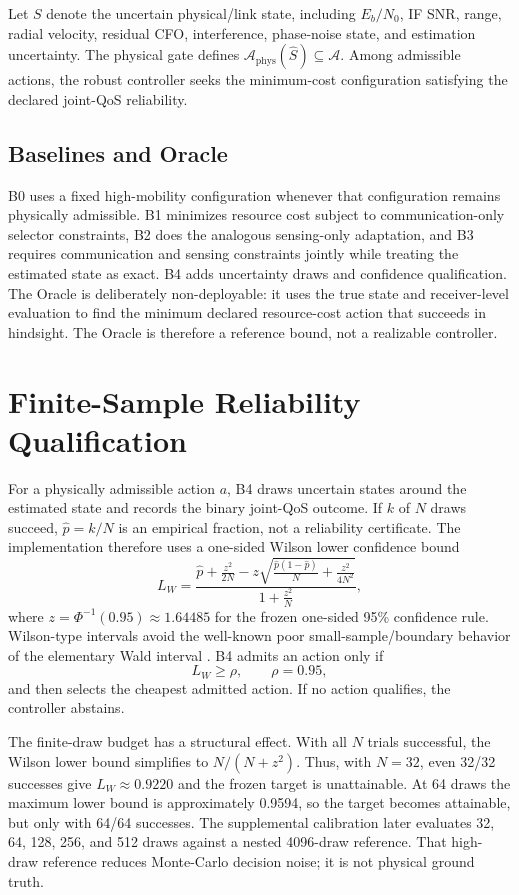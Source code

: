 \documentclass[journal]{IEEEtran}
\begin{document}
Let $S$ denote the uncertain physical/link state, including $E_b/N_0$, IF SNR, range, radial velocity, residual CFO, interference, phase-noise state, and estimation uncertainty. The physical gate defines $\mathcal{A}_{\mathrm{phys}}(\hat S)\subseteq\mathcal{A}$. Among admissible actions, the robust controller seeks the minimum-cost configuration satisfying the declared joint-QoS reliability.

\subsection{Baselines and Oracle}
B0 uses a fixed high-mobility configuration whenever that configuration remains physically admissible. B1 minimizes resource cost subject to communication-only selector constraints, B2 does the analogous sensing-only adaptation, and B3 requires communication and sensing constraints jointly while treating the estimated state as exact. B4 adds uncertainty draws and confidence qualification. The Oracle is deliberately non-deployable: it uses the true state and receiver-level evaluation to find the minimum declared resource-cost action that succeeds in hindsight. The Oracle is therefore a reference bound, not a realizable controller.

\section{Finite-Sample Reliability Qualification}
\label{sec:confidence}
For a physically admissible action $a$, B4 draws uncertain states around the estimated state and records the binary joint-QoS outcome. If $k$ of $N$ draws succeed, $\hat p=k/N$ is an empirical fraction, not a reliability certificate. The implementation therefore uses a one-sided Wilson lower confidence bound
\begin{equation}
 L_W=\frac{\hat p+\frac{z^2}{2N}-z\sqrt{\frac{\hat p(1-\hat p)}{N}+\frac{z^2}{4N^2}}}{1+\frac{z^2}{N}},
\end{equation}
where $z=\Phi^{-1}(0.95)\approx1.64485$ for the frozen one-sided 95\% confidence rule. Wilson-type intervals avoid the well-known poor small-sample/boundary behavior of the elementary Wald interval \cite{brown2001binomial}. B4 admits an action only if
\begin{equation}
 L_W\ge\rho,\qquad \rho=0.95,
\end{equation}
and then selects the cheapest admitted action. If no action qualifies, the controller abstains.

The finite-draw budget has a structural effect. With all $N$ trials successful, the Wilson lower bound simplifies to $N/(N+z^2)$. Thus, with $N=32$, even 32/32 successes give $L_W\approx0.9220$ and the frozen target is unattainable. At 64 draws the maximum lower bound is approximately 0.9594, so the target becomes attainable, but only with 64/64 successes. The supplemental calibration later evaluates 32, 64, 128, 256, and 512 draws against a nested 4096-draw reference. That high-draw reference reduces Monte-Carlo decision noise; it is not physical ground truth.
\end{document}
